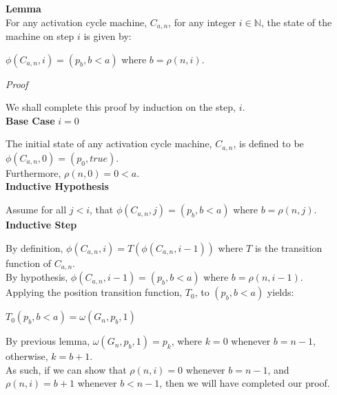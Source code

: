 \documentclass[a4paper,12pt]{article}
\begin{document}
\label{lemma:acm_position}
\hypertarget{lemma:acm_position}{}
\begin{tcolorbox}
\textbf{Lemma}\\
For any activation cycle machine, $C_{a, n}$, for any integer $i \in \mathbb{N}$, the state of the machine on step $i$ is given by:
\begin{center}
$\phi(C_{a, n}, i) = (p_b, b < a)$ where $b = \rho(n, i)$.
\end{center}
\end{tcolorbox}


\noindent
\textit{Proof}

\noindent We shall complete this proof by induction on the step, $i$.\\


\noindent
\textbf{Base Case} $i = 0$

\noindent The initial state of any activation cycle machine, $C_{a,n}$, is defined to be $\phi(C_{a,n}, 0) = (p_0, true)$.\\

\noindent Furthermore, $\rho(n, 0) = 0 < a$.\\


\noindent
\textbf{Inductive Hypothesis}

\noindent Assume for all $j < i$, that $\phi(C_{a, n}, j) = (p_b, b < a)$ where $b = \rho(n, j)$.\\


\noindent
\textbf{Inductive Step}

\noindent By definition, $\phi(C_{a, n}, i) = T(\phi(C_{a,n}, i - 1))$ where $T$ is the transition function of $C_{a, n}$.\\

\noindent By hypothesis, $\phi(C_{a,n}, i - 1) = (p_b, b < a)$ where $b = \rho(n, i - 1)$.\\

\noindent Applying the position transition function, $T_0$, to $(p_b, b < a)$ yields:
\begin{center}
$T_0(p_b, b < a) = \omega(G_n, p_b, 1)$
\end{center}

\noindent By previous lemma, $\omega(G_n, p_b, 1) = p_k$, where $k = 0$ whenever $b = n - 1$, otherwise, $k = b + 1$.\\

\noindent As such, if we can show that $\rho(n, i) = 0$ whenever $b = n - 1$, and $\rho(n, i) = b + 1$ whenever $b < n - 1$, then we will have completed our proof.\\
\end{document}
